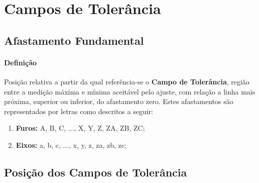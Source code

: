 \documentclass{article}
\begin{document}
    \section{Campos de Tolerância}
        \subsection{Afastamento Fundamental}
            \paragraph{Definição}Posição relativa a partir da qual referência-se o \textbf{Campo de Tolerância}, região entre a medição máxima e mínima aceitável pelo ajuste, com relação a linha mais próxima, superior ou inferior, do afastamento zero. Estes afastamentos são representados por letras como descritos a seguir:
                \begin{enumerate}[noitemsep]
                    \item \textbf{Furos:} A, B, C, ..., X, Y, Z, ZA, ZB, ZC;
                    \item \textbf{Eixos:} a, b, c, ..., x, y, z, za, zb, zc;
                \end{enumerate}

        \subsection{Posição dos Campos de Tolerância}
\end{document}
